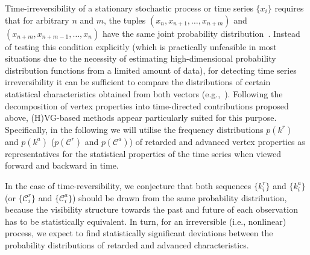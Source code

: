 		
		Time-{ir}reversibility of a stationary stochastic process or time series $\{x_i\}$ requires that for arbitrary $n$ and $m$, the tuples $(x_n,x_{n+1},\dots,x_{n+m})$ and $(x_{n+m},x_{n+m-1},\dots,x_n)$ have the same joint probability distribution~\cite{Lawrance1991}. Instead of testing this condition explicitly (which is practically unfeasible in most situations due to the necessity of estimating high-dimensional probability distribution functions from a limited amount of data), for detecting time series irreversibility it can be sufficient to compare the distributions of certain statistical characteristics obtained from both vectors (e.g.,~\cite{Tong1990}). Following the decomposition of vertex properties into time-directed contributions proposed above, (H)VG-based methods appear particularly suited for this purpose. Specifically, in the following we will utilise the frequency distributions {$p(k^{r})$ and $p(k^{a})$ ($p(\mathcal{C}^{r})$ and $p(\mathcal{C}^{a})$)} of retarded and advanced {vertex properties} as representatives for the statistical properties of the time series when viewed forward and backward in time. 

		In the case of time-reversibility, we conjecture that both sequences {$\{k_i^{r}\}$ and $\{k_i^{a}\}$} (or {$\{\mathcal{C}_i^{r}\}$ and $\{\mathcal{C}_i^{a}\}$}) should be drawn from the same probability distribution, because the visibility structure towards the past and future of each observation has to be statistically equivalent. In turn, for an irreversible (i.e., nonlinear) process, we expect to find statistically significant deviations between the probability distributions of retarded and advanced characteristics. 

